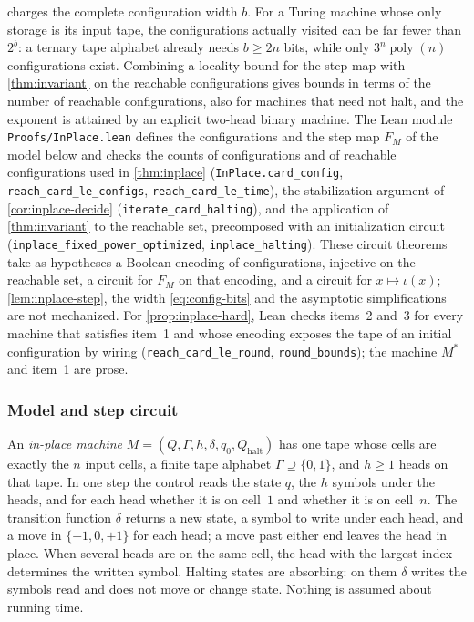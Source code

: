 \documentclass[11pt]{article}
\theoremstyle{definition}
\theoremstyle{remark}
\newcommand{\bits}{\{0,1\}}
\newcommand{\poly}{\operatorname{poly}}
\numberwithin{equation}{section}
\begin{document}
 charges the complete configuration width $b$.  For a
Turing machine whose only storage is its input tape, the configurations
actually visited can be far fewer than $2^b$: a ternary tape alphabet
already needs $b\geq2n$ bits, while only $3^n\poly(n)$ configurations
exist.  Combining a locality bound for the step map with
\cref{thm:invariant} on the reachable configurations gives bounds in
terms of the number of reachable configurations, also for machines that
need not halt, and the exponent is attained by an explicit two-head
binary machine.  The Lean module \texttt{Proofs/InPlace.lean} defines the
configurations and the step map $F_M$ of the model below and checks the
counts of configurations and of reachable configurations used in
\cref{thm:inplace} (\texttt{InPlace.card\_config},
\texttt{reach\_card\_le\_configs}, \texttt{reach\_card\_le\_time}), the
stabilization argument of \cref{cor:inplace-decide}
(\texttt{iterate\_card\_halting}), and the application of
\cref{thm:invariant} to the reachable set, precomposed with an
initialization circuit (\texttt{inplace\_fixed\_power\_optimized},
\texttt{inplace\_halting}).  These circuit theorems take as hypotheses a
Boolean encoding of configurations, injective on the reachable set, a
circuit for $F_M$ on that encoding, and a circuit for $x\mapsto\iota(x)$;
\cref{lem:inplace-step}, the width \cref{eq:config-bits} and the
asymptotic simplifications are not mechanized.  For
\cref{prop:inplace-hard}, Lean checks items~2 and~3 for every machine
that satisfies item~1 and whose encoding exposes the tape of an initial
configuration by wiring (\texttt{reach\_card\_le\_round},
\texttt{round\_bounds}); the machine $M^*$ and item~1 are prose.

\subsubsection{Model and step circuit}

An \emph{in-place machine} $M=(Q,\Gamma,h,\delta,q_0,Q_{\mathrm{halt}})$
has one tape whose cells are exactly the $n$ input cells, a finite tape
alphabet $\Gamma\supseteq\bits$, and $h\geq1$ heads on that tape.  In
one step the control reads the state $q$, the $h$ symbols under the
heads, and for each head whether it is on cell~$1$ and whether it is on
cell~$n$.  The transition function $\delta$ returns a new state, a
symbol to write under each head, and a move in $\{-1,0,+1\}$ for each
head; a move past either end leaves the head in place.  When several
heads are on the same cell, the head with the largest index determines
the written symbol.  Halting states are absorbing: on them $\delta$
writes the symbols read and does not move or change state.  Nothing is
assumed about running time.
\end{document}
